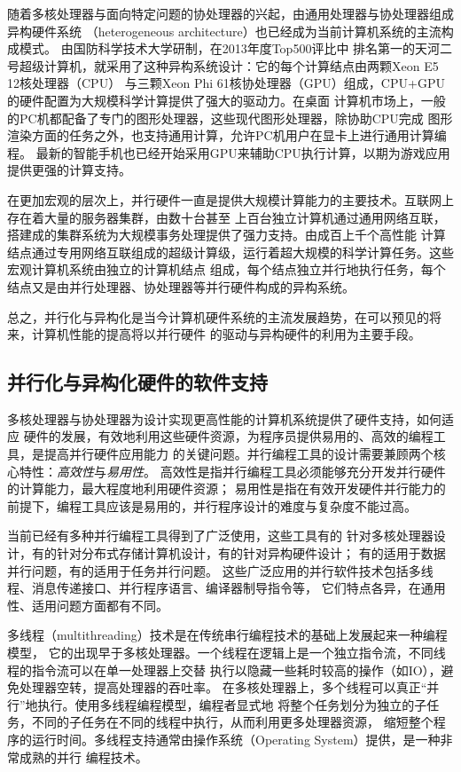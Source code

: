 随着多核处理器与面向特定问题的协处理器的兴起，由通用处理器与协处理器组成异构硬件系统
（heterogeneous architecture）也已经成为当前计算机系统的主流构成模式。
由国防科学技术大学研制，在2013年度Top500评比中
排名第一的天河二号超级计算机，就采用了这种异构系统设计：它的每个计算结点由两颗Xeon E5 12核处理器（CPU）
与三颗Xeon Phi 61核协处理器（GPU）组成，CPU+GPU的硬件配置为大规模科学计算提供了强大的驱动力。在桌面
计算机市场上，一般的PC机都配备了专门的图形处理器，这些现代图形处理器，除协助CPU完成
图形渲染方面的任务之外，也支持通用计算，允许PC机用户在显卡上进行通用计算编程。
最新的智能手机也已经开始采用GPU来辅助CPU执行计算，以期为游戏应用提供更强的计算支持。

在更加宏观的层次上，并行硬件一直是提供大规模计算能力的主要技术。互联网上存在着大量的服务器集群，由数十台甚至
上百台独立计算机通过通用网络互联，搭建成的集群系统为大规模事务处理提供了强力支持。由成百上千个高性能
计算结点通过专用网络互联组成的超级计算级，运行着超大规模的科学计算任务。这些宏观计算机系统由独立的计算机结点
组成，每个结点独立并行地执行任务，每个结点又是由并行处理器、协处理器等并行硬件构成的异构系统。

总之，并行化与异构化是当今计算机硬件系统的主流发展趋势，在可以预见的将来，计算机性能的提高将以并行硬件
的驱动与异构硬件的利用为主要手段。

\subsection{并行化与异构化硬件的软件支持}
多核处理器与协处理器为设计实现更高性能的计算机系统提供了硬件支持，如何适应
硬件的发展，有效地利用这些硬件资源，为程序员提供易用的、高效的编程工具，是提高并行硬件应用能力
的关键问题。并行编程工具的设计需要兼顾两个核心特性：\emph{高效性}与\emph{易用性}。
高效性是指并行编程工具必须能够充分开发并行硬件的计算能力，最大程度地利用硬件资源；
易用性是指在有效开发硬件并行能力的前提下，编程工具应该是易用的，并行程序设计的难度与复杂度不能过高。

当前已经有多种并行编程工具得到了广泛使用，这些工具有的
针对多核处理器设计，有的针对分布式存储计算机设计，有的针对异构硬件设计；
有的适用于数据并行问题，有的适用于任务并行问题。
这些广泛应用的并行软件技术包括多线程、消息传递接口、并行程序语言、编译器制导指令等，
它们特点各异，在通用性、适用问题方面都有不同。

多线程（multithreading）技术是在传统串行编程技术的基础上发展起来一种编程模型，
它的出现早于多核处理器。一个线程在逻辑上是一个独立指令流，不同线程的指令流可以在单一处理器上交替
执行以隐藏一些耗时较高的操作（如IO），避免处理器空转，提高处理器的吞吐率。
在多核处理器上，多个线程可以真正“并行”地执行。使用多线程编程模型，编程者显式地
将整个任务划分为独立的子任务，不同的子任务在不同的线程中执行，从而利用更多处理器资源，
缩短整个程序的运行时间。多线程支持通常由操作系统（Operating System）提供，是一种非常成熟的并行
编程技术。%

